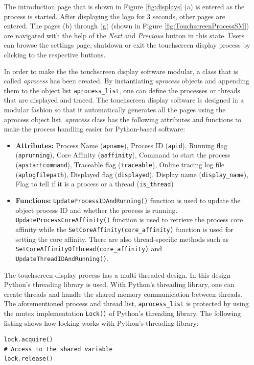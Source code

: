 The introduction page that is shown in Figure \ref{fig:displays} (a) is entered as the process is started. After displaying the logo for 3 seconds, other pages are entered. The pages (b) through (g) (shown in Figure \ref{fig:TouchscreenProcessSM}) are navigated with the help of the \textit{Next} and \textit{Previous} button in this state. Users can browse the settings page, shutdown or exit the touchscreen display process by clicking to the respective buttons.

In order to make the the touchscreen display software modular, a class that is called \textit{aprocess} has been created. By instantiating \textit{aprocess} objects and appending them to the object list \texttt{aprocess\texttt{\_}list}, one can define the processes or threads that are displayed and traced. The touchscreen display software is designed in a modular fashion so that it automatically generates all the pages using the aprocess object list. \textit{aprocess} class has the following attributes and functions to make the process handling easier for Python-based software:

\begin{itemize}
	\item \textbf{Attributes:} Process Name (\texttt{apname}), Process ID (\texttt{apid}), Running flag (\texttt{aprunning}), Core Affinity (\texttt{aaffinity}), Command to start the process (\texttt{apstartcommand}), Traceable flag (\texttt{traceable}), Online tracing log file (\texttt{aplogfilepath}), Displayed flag (\texttt{displayed}), Display name (\texttt{display\_name}), Flag to tell if it is a process or a thread (\texttt{is\_thread})
	\item \textbf{Functions:} \texttt{UpdateProcessIDAndRunning()} function is used to update the object process ID and whether the process is running. \texttt{UpdateProcessCoreAffinity()} function is used to retrieve the process core affinity while the  \texttt{SetCoreAffinity(core\_affinity)} function is used for setting the core affinity. There are also thread-specific methods such as \texttt{SetCoreAffinityOfThread(core\_affinity)} and \texttt{UpdateThreadIDAndRunning()}.
\end{itemize}

The touchscreen display process has a multi-threaded design. In this design Python's threading library \cite{pythonthreading} is used. With Python's threading library, one can create threads and handle the shared memory communication between threads. The aforementioned process and thread list, \texttt{aprocess{\_}list} is protected by using the mutex implementation \texttt{Lock()} \cite{pythonthreading} of Python's threading library. The following listing shows how locking works with Python's threading library:
\begin{lstlisting}[style=python]
lock.acquire()
# Access to the shared variable
lock.release()
\end{lstlisting}

